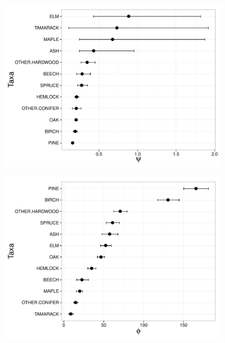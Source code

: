 \begin{figure}
\centering
\includegraphics[width=7in]{figures/psi_vary_psi.pdf}
\caption{}
\label{fig:psi_vary_psi}
\end{figure}

\begin{figure}
\centering
\includegraphics[width=7in]{figures/phi_vary_psi.pdf}
\caption{}
\label{fig:phi_vary_psi}
\end{figure}

